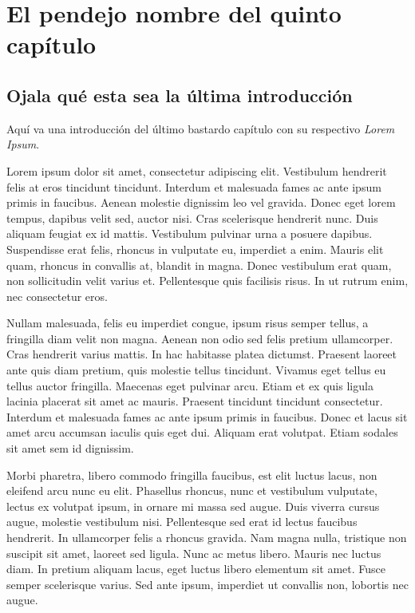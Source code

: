
\chapter{El pendejo nombre del quinto capítulo}
\label{capV}



\section{Ojala qué esta sea la última introducción}

Aquí va una introducción del último bastardo capítulo con su respectivo \textit{Lorem Ipsum}.

Lorem ipsum dolor sit amet, consectetur adipiscing elit. Vestibulum hendrerit felis at eros tincidunt tincidunt. Interdum et malesuada fames ac ante ipsum primis in faucibus. Aenean molestie dignissim leo vel gravida. Donec eget lorem tempus, dapibus velit sed, auctor nisi. Cras scelerisque hendrerit nunc. Duis aliquam feugiat ex id mattis. Vestibulum pulvinar urna a posuere dapibus. Suspendisse erat felis, rhoncus in vulputate eu, imperdiet a enim. Mauris elit quam, rhoncus in convallis at, blandit in magna. Donec vestibulum erat quam, non sollicitudin velit varius et. Pellentesque quis facilisis risus. In ut rutrum enim, nec consectetur eros.

Nullam malesuada, felis eu imperdiet congue, ipsum risus semper tellus, a fringilla diam velit non magna. Aenean non odio sed felis pretium ullamcorper. Cras hendrerit varius mattis. In hac habitasse platea dictumst. Praesent laoreet ante quis diam pretium, quis molestie tellus tincidunt. Vivamus eget tellus eu tellus auctor fringilla. Maecenas eget pulvinar arcu. Etiam et ex quis ligula lacinia placerat sit amet ac mauris. Praesent tincidunt tincidunt consectetur. Interdum et malesuada fames ac ante ipsum primis in faucibus. Donec et lacus sit amet arcu accumsan iaculis quis eget dui. Aliquam erat volutpat. Etiam sodales sit amet sem id dignissim.

Morbi pharetra, libero commodo fringilla faucibus, est elit luctus lacus, non eleifend arcu nunc eu elit. Phasellus rhoncus, nunc et vestibulum vulputate, lectus ex volutpat ipsum, in ornare mi massa sed augue. Duis viverra cursus augue, molestie vestibulum nisi. Pellentesque sed erat id lectus faucibus hendrerit. In ullamcorper felis a rhoncus gravida. Nam magna nulla, tristique non suscipit sit amet, laoreet sed ligula. Nunc ac metus libero. Mauris nec luctus diam. In pretium aliquam lacus, eget luctus libero elementum sit amet. Fusce semper scelerisque varius. Sed ante ipsum, imperdiet ut convallis non, lobortis nec augue.

